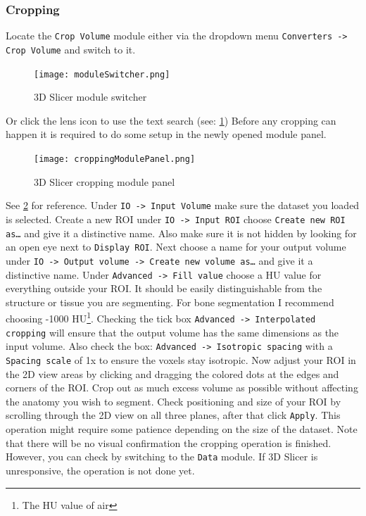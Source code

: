 \subsubsection{Cropping}\label{crop}
Locate the \texttt{Crop Volume} module either via the dropdown menu
\texttt{Converters -> Crop Volume} and switch to it.
\begin{figure}[h!]
	\centerline{
		\texttt{[image: moduleSwitcher.png]}}
	\caption{3D Slicer module switcher}\label{fig:mS}
\end{figure}
Or click the lens icon to use the text search (see: \cref{fig:mS})
Before any cropping can happen it is required to do some setup in the newly opened module panel.
\begin{figure}[h!]
	\centerline{
		\texttt{[image: croppingModulePanel.png]}}
	\caption{3D Slicer cropping module panel}\label{fig:cMP}
\end{figure}
See \cref{fig:cMP} for reference.
Under \texttt{IO -> Input Volume} make sure the dataset you loaded is selected.
Create a new ROI under \texttt{IO -> Input ROI} choose \texttt{Create new ROI as\ldots} and give it a distinctive name. Also make sure it is not hidden by looking for an open eye next to \texttt{Display ROI}.
Next choose a name for your output volume under \texttt{IO -> Output volume -> Create new volume as\ldots} and give it a distinctive name.
Under \texttt{Advanced -> Fill value} choose a HU value for everything outside your ROI. It should be easily distinguishable from the structure or tissue you are segmenting. For bone segmentation I recommend choosing -1000 HU\footnote{The HU value of air}. Checking the tick box \texttt{Advanced -> Interpolated cropping} will ensure that the output volume has the same dimensions as the input volume.
Also check the box: \texttt{Advanced -> Isotropic spacing} with a \texttt{Spacing scale} of 1x to ensure the voxels stay isotropic.
Now adjust your ROI in the 2D view areas by clicking and dragging the colored dots at the edges and corners of the ROI.
Crop out as much excess volume as possible without affecting the anatomy you wish to segment.
Check positioning and size of your ROI by scrolling through the 2D view on all three planes, after that click \texttt{Apply}.
This operation might require some patience depending on the size of the dataset.
Note that there will be no visual confirmation the cropping operation is finished.
However, you can check by switching to the \texttt{Data} module.
If 3D Slicer is unresponsive, the operation is not done yet.
